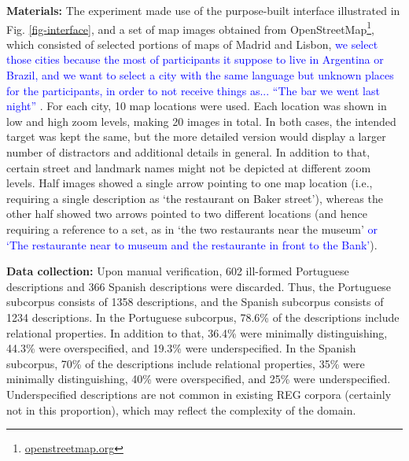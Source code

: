 \documentclass[11pt]{article}
\begin{document}
{\bf Materials:} The experiment made use of the purpose-built interface illustrated in Fig. \ref{fig-interface}, and a set of map images obtained from OpenStreetMap\footnote{\url{openstreetmap.org}}, which consisted of selected portions of maps of Madrid and Lisbon,  \textcolor{blue}{we select those cities because the most of participants it suppose to live in Argentina or Brazil, and we want to select a city with the same language but unknown places for the participants, in order to not receive things as... ``The bar we went last night''} . For each city, 10 map locations were used. Each location was shown in low and high zoom levels, making 20 images in total. In both cases, the intended target was kept the same, but the more detailed version would display a larger number of distractors and additional details in general. In addition to that, certain street and landmark names might not be depicted at different zoom levels. Half images showed a single arrow pointing to one map location (i.e., requiring a single description as `the restaurant on Baker street'), whereas the other half showed two arrows pointed to two different locations (and hence requiring a reference to a set, as in `the two restaurants near the museum'\textcolor{blue}{ or `The restaurante near to museum and the restaurante in front to the Bank'}). 

{\bf Data collection:} Upon manual verification, 602 ill-formed Portuguese descriptions and 366 Spanish descriptions were discarded. Thus, the Portuguese subcorpus consists of 1358 descriptions, and the Spanish subcorpus consists of 1234 descriptions. In the Portuguese subcorpus, 78.6\% of the descriptions include relational properties. In addition to that, 36.4\% were minimally distinguishing, 44.3\% were overspecified, and  19.3\% were underspecified. In the Spanish subcorpus, 70\% of the descriptions include relational properties, 35\% were minimally distinguishing, 40\% were overspecified, and 25\% were underspecified. Underspecified descriptions are not common in existing REG corpora (certainly not in this proportion), which may reflect the complexity of the domain.
\end{document}
